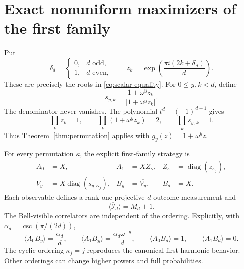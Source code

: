 \documentclass[11pt]{article}
\theoremstyle{definition}
\theoremstyle{remark}
\newcommand{\cI}{\mathcal I}
\newcommand{\absop}[1]{\lvert #1\rvert}
\begin{document}
\section{Exact nonuniform maximizers of the first family}
\label{sec:biased}

Put
\begin{equation}
 \delta_d=\begin{cases}0,&d\text{ odd},\\1,&d\text{ even},\end{cases}
 \qquad
 z_k=\exp\!\left(\frac{\pi i(2k+\delta_d)}d\right).
 \label{eq:equality-roots}
\end{equation}
These are precisely the roots in \eqref{eq:scalar-equality}.  For
\(0\leq y,k<d\), define
\[
 s_{y,k}=\frac{1+\omega^yz_k}{\absop{1+\omega^yz_k}}.
\]
The denominator never vanishes.  The polynomial
\(t^d-(-1)^{d-1}\) gives
\begin{equation}
 \prod_kz_k=1,
 \qquad
 \prod_k(1+\omega^yz_k)=2,
 \qquad
 \prod_ks_{y,k}=1.
 \label{eq:cyclic-products}
\end{equation}
Thus Theorem~\ref{thm:permutation} applies with
\(g_y(z)=1+\omega^yz\).

For every permutation \(\kappa\), the explicit first-family strategy is
\begin{equation}
\begin{aligned}
 A_0&=X,& A_1&=X Z_\kappa,&
 Z_\kappa&=\operatorname{diag}(z_{\kappa_j}),\\
 V_y&=X\operatorname{diag}(s_{y,\kappa_j}),&
 B_y&=\overline{V_y},& B_d&=X.
\end{aligned}
\label{eq:first-strategy}
\end{equation}
Each observable defines a rank-one projective \(d\)-outcome measurement and
\[
 \langle\overline{\cI}_d\rangle=M_d+1.
\]
The Bell-visible correlators are independent of the ordering.  Explicitly,
with \(\alpha_d=\csc(\pi/(2d))\),
\begin{equation}
 \langle A_0B_y\rangle=\frac{\alpha_d}{d},
 \qquad
 \langle A_1B_y\rangle=\frac{\alpha_d\omega^{-y}}d,
 \qquad
 \langle A_0B_d\rangle=1,
 \qquad
 \langle A_1B_d\rangle=0.
 \label{eq:visible-correlators}
\end{equation}
The cyclic ordering \(\kappa_j=j\) reproduces the canonical first-harmonic
behavior.  Other orderings can change higher powers and full probabilities.
\end{document}
